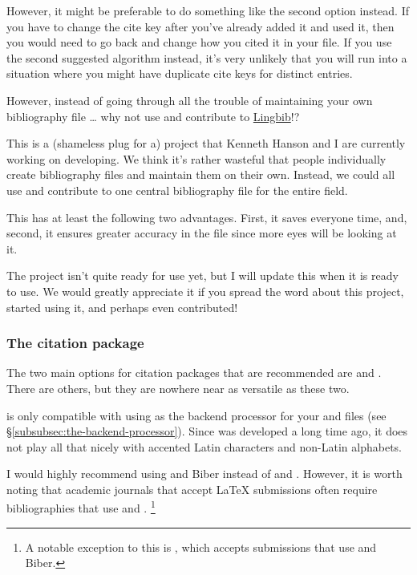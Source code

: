 However, it might be preferable to do something like the second option instead.
If you have to change the cite key after you've already added it and used it, then you would need to go back and change how you cited it in your  file.
If you use the second suggested algorithm instead, it's very unlikely that you will run into a situation where you might have duplicate cite keys for distinct entries.

\label{subsubsubsec:lingbib}

However, instead of going through all the trouble of maintaining your own bibliography file \ldots{} why not use and contribute to \href{https://github.com/lingbib/lingbib}{Lingbib}!?

This is a (shameless plug for a) project that Kenneth Hanson and I are currently working on developing.
We think it's rather wasteful that people individually create bibliography files and maintain them on their own.
Instead, we could all use and contribute to one central bibliography file for the entire field.

This has at least the following two advantages. First, it saves everyone time, and, second, it ensures greater accuracy in the  file since more eyes will be looking at it.

The project isn't quite ready for use yet, but I will update this  when it is ready to use.
We would greatly appreciate it if you spread the word about this project, started using it, and perhaps even contributed! \ASCIIEmoji{:)}

\subsubsection{The citation package}
\label{subsubsec:the-citation-package}

The two main options for citation packages that are recommended are  and .
There are others, but they are nowhere near as versatile as these two.

\label{subsubsubsec:natbib}

 is only compatible with using  as the backend processor for your  and  files (see \S\ref{subsubsec:the-backend-processor}).
Since  was developed a long time ago, it does not play all that nicely with accented Latin characters and non-Latin alphabets.

I would highly recommend using  and Biber instead of  and .
However, it is worth noting that academic journals that accept \LaTeX{} submissions often require bibliographies that use  and .%
\footnote{%
A notable exception to this is \href{http://semprag.org/}{}, which accepts submissions that use  and Biber.%
}

